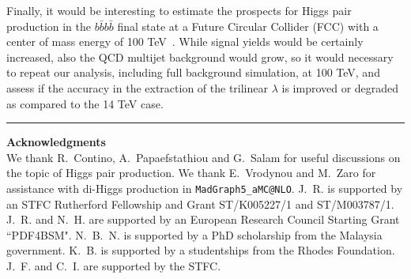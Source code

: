 Finally, it would be interesting to estimate the prospects for
Higgs pair production in the $b\bar{b}b\bar{b}$  final
state at a Future Circular
Collider (FCC) with a center of mass energy of
100 TeV~\cite{Barr:2014sga,Azatov:2015oxa,Papaefstathiou:2015iba}.
%
While signal yields would be certainly increased, also the QCD
multijet background would grow, so it would necessary to repeat
our analysis, including full background simulation, at 100 TeV,
and assess if the accuracy in the extraction of the trilinear $\lambda$
is improved or degraded as compared to the 14 TeV case.
%



\bigskip
\bigskip
\begin{center}
\rule{5cm}{.1pt}
\end{center}
\bigskip
\bigskip

{\bf\noindent  Acknowledgments \\}
We thank R.~Contino, A.~Papaefstathiou and
G.~Salam for useful discussions on the topic
of Higgs pair production.
%
We thank E.~Vrodynou and M.~Zaro for assistance with di-Higgs production
  in {\tt MadGraph5\_aMC@NLO}.
%
  J.~R. is supported by an STFC Rutherford Fellowship and
  Grant ST/K005227/1 and ST/M003787/1.
%
J.~R. and N.~H. are
supported by an European Research Council Starting Grant ``PDF4BSM".
%
N.~B.~N. is supported by a PhD scholarship from the Malaysia
government.
%
K.~B. is supported by a studentships from the Rhodes Foundation.
%
J.~F. and C.~I. are supported by the STFC.
